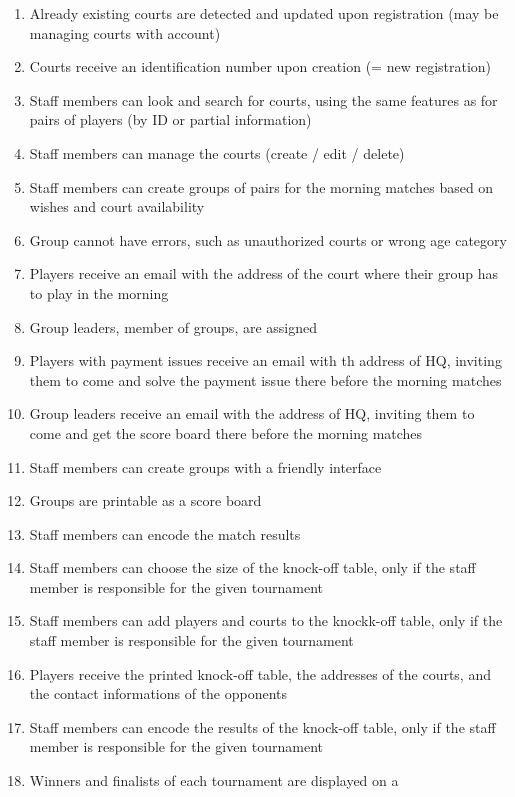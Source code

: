 \begin{enumerate}
    \item Already existing courts are detected and updated upon
        registration (may be managing courts with account)
    \item Courts receive an identification number upon creation (= new
        registration)
    \item Staff members can look and search for courts, using the same
        features as for pairs of players (by ID or partial information)
    \item Staff members can manage the courts (create / edit / delete)
    \item Staff members can create groups of pairs for the morning
        matches based on wishes and court availability
    \item Group cannot have errors, such as unauthorized courts or wrong
        age category
    \item Players receive an email with the address of the court where
        their group has to play in the morning
    \item Group leaders, member of groups, are assigned
    \item Players with payment issues receive an email with th address
        of HQ, inviting them to come and solve the payment issue there
        before the morning matches
    \item Group leaders receive an email with the address of HQ,
        inviting them to come and get the score board there before the
        morning matches
    \item Staff members can create groups with a friendly interface
    \item Groups are printable as a score board
    \item Staff members can encode the match results
    \item Staff members can choose the size of the knock-off table, only
        if the staff member is responsible for the given tournament
    \item Staff members can add players and courts to the knockk-off
        table, only if the staff member is responsible for the given
        tournament
    \item Players receive the printed knock-off table, the addresses of
        the courts, and the contact informations of the opponents
    \item Staff members can encode the results of the knock-off table,
        only if the staff member is responsible for the given tournament
    \item Winners and finalists of each tournament are displayed on a

\end{enumerate}
